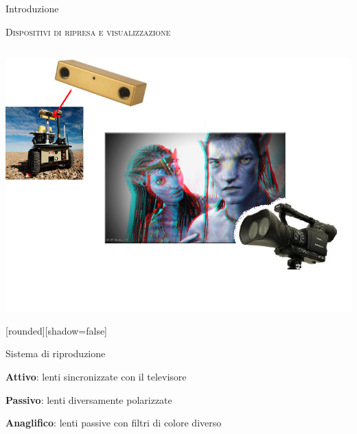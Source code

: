 \documentclass{beamer}
\begin{document}
\begin{section}{Introduzione}
\begin{frame}[t]{\textsc{Dispositivi di ripresa e visualizzazione}}
\begin{columns}
\begin{column}{5cm}

\centering
\vspace{0.7em}
\includegraphics[width=1\linewidth]{./img/camere.png}
\vspace{-2.8em}
\begin{center}
[rounded][shadow=false]
\begin{block}{Sistema di riproduzione}
		\begin{itemize}
			\item  \small{\textbf{Attivo}: lenti sincronizzate con il televisore
			\item \textbf{Passivo}: lenti diversamente polarizzate
			\item \textbf{Anaglifico}: lenti passive con filtri di colore diverso}
		\end{itemize}	
	\end{block}
\end{center}
\end{column}
\end{columns}
\end{frame}


\end{section}
\end{document}
